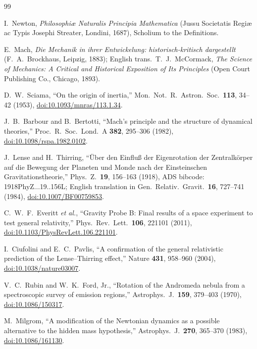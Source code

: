 \documentclass[aps,reprint,amsmath,amssymb,nofootinbib,superscriptaddress,floatfix]{revtex4-2}
\begin{document}
\begin{thebibliography}{99}

I.~Newton, \emph{Philosophi\ae{} Naturalis Principia Mathematica}
(Jussu Societatis Regi\ae{} ac Typis Josephi Streater, Londini, 1687),
Scholium to the Definitions.

E.~Mach, \emph{Die Mechanik in ihrer Entwickelung:
historisch-kritisch dargestellt} (F.~A.~Brockhaus, Leipzig, 1883);
English trans.\ T.~J.~McCormack, \emph{The Science of Mechanics:
A Critical and Historical Exposition of Its Principles}
(Open Court Publishing Co., Chicago, 1893).

D.~W.~Sciama, ``On the origin of inertia,''
Mon.\ Not.\ R.\ Astron.\ Soc.\ \textbf{113}, 34--42 (1953),
\href{https://doi.org/10.1093/mnras/113.1.34}
{doi:10.1093/mnras/113.1.34}.

J.~B.~Barbour and B.~Bertotti, ``Mach's principle and the structure of
dynamical theories,''
Proc.\ R.\ Soc.\ Lond.\ A \textbf{382}, 295--306 (1982),
\href{https://doi.org/10.1098/rspa.1982.0102}
{doi:10.1098/rspa.1982.0102}.

J.~Lense and H.~Thirring, ``\"Uber den Einflu\ss{} der Eigenrotation
der Zentralk\"orper auf die Bewegung der Planeten und Monde nach der
Einsteinschen Gravitationstheorie,''
Phys.\ Z.\ \textbf{19}, 156--163 (1918),
ADS bibcode: 1918PhyZ...19..156L; English translation in
Gen.\ Relativ.\ Gravit.\ \textbf{16}, 727--741 (1984),
\href{https://doi.org/10.1007/BF00759853}{doi:10.1007/BF00759853}.

C.~W.~F.~Everitt \emph{et al.}, ``Gravity Probe B: Final results of a
space experiment to test general relativity,''
Phys.\ Rev.\ Lett.\ \textbf{106}, 221101 (2011),
\href{https://doi.org/10.1103/PhysRevLett.106.221101}
{doi:10.1103/PhysRevLett.106.221101}.

I.~Ciufolini and E.~C.~Pavlis, ``A confirmation of the general
relativistic prediction of the Lense--Thirring effect,''
Nature \textbf{431}, 958--960 (2004),
\href{https://doi.org/10.1038/nature03007}{doi:10.1038/nature03007}.

V.~C.~Rubin and W.~K.~Ford, Jr., ``Rotation of the Andromeda nebula
from a spectroscopic survey of emission regions,''
Astrophys.\ J.\ \textbf{159}, 379--403 (1970),
\href{https://doi.org/10.1086/150317}{doi:10.1086/150317}.

M.~Milgrom, ``A modification of the Newtonian dynamics as a possible
alternative to the hidden mass hypothesis,''
Astrophys.\ J.\ \textbf{270}, 365--370 (1983),
\href{https://doi.org/10.1086/161130}{doi:10.1086/161130}.


\end{thebibliography}
\end{document}
